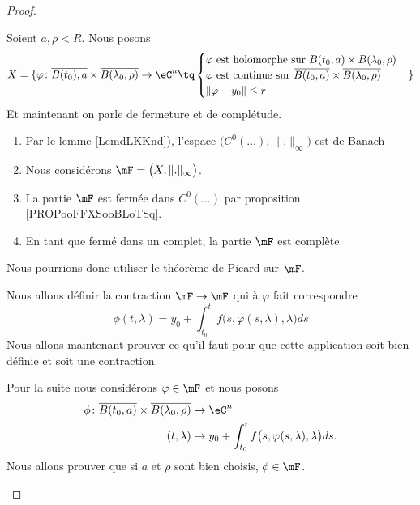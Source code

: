 \begin{proof}
\begin{subproof}
		Soient \( a,\rho<R\). Nous posons
		\begin{equation}
			X=\{\varphi \colon\overline{B(t_0),a}\times \overline{B(\lambda_0,\rho)}\to \eC^{n}\tq
			\begin{cases}
				\varphi\text{ est holomorphe sur \( B(t_0,a)\times B(\lambda_0,\rho)\)}                     \\
				\varphi\text{ est continue sur \( \overline{B(t_0,a)}\times \overline{B(\lambda_0,\rho)}\)} \\
				\| \varphi-y_0 \|\leq r
			\end{cases}
			\}
		\end{equation}
		Et maintenant on parle de fermeture et de complétude.
		\begin{enumerate}
			\item
			      Par le lemme \ref{LemdLKKnd}), l'espace \( \big( C^0(\ldots),\| . \|_{\infty} \big)\) est de Banach
			\item
			      Nous considérons \( \mF=\big( X,\| . \|_{\infty} \big)\).
			\item
			      La partie \( \mF\) est fermée dans \( C^0(\ldots)\) par proposition \ref{PROPooFFXSooBLoTSq}.
			\item
			      En tant que fermé dans un complet, la partie \( \mF\) est complète.
		\end{enumerate}
		Nous pourrions donc utiliser le théorème de Picard sur \( \mF\).

		\spitem[La suite]
		Nous allons définir la contraction \( \mF\to\mF\) qui à \( \varphi\) fait correspondre
		\begin{equation}
			\phi(t,\lambda)=y_0+\int_{t_0}^tf\big( s,\varphi(s,\lambda),\lambda \big)ds
		\end{equation}
		Nous allons maintenant prouver ce qu'il faut pour que cette application soit bien définie et soit une contraction.

		Pour la suite nous considérons \( \varphi\in \mF\) et nous posons
		\begin{equation}
			\begin{aligned}
				\phi\colon \overline{B(t_0,a)}\times \overline{B(\lambda_0,\rho)} & \to \eC^n                                                            \\
				(t,\lambda)                                                       & \mapsto y_0+\int_{t_0}^tf\big( s,\varphi(s,\lambda),\lambda \big)ds.
			\end{aligned}
		\end{equation}
		Nous allons prouver que si \( a\) et \( \rho\) sont bien choisis, \( \phi\in \mF\).


\end{subproof}
\end{proof}
